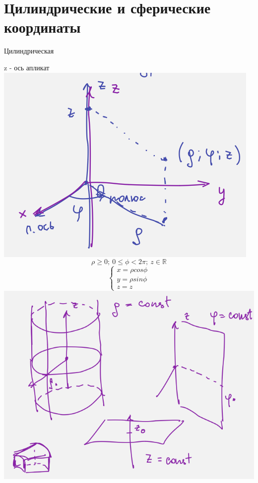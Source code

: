 \documentclass{article}
\begin{document}
\section{Цилиндрические и сферические координаты}
\begin{minipage}{.5\textwidth}
Цилиндрическая

z - ось апликат\\
\includegraphics[width=.6\textwidth]{chill}\\
\begin{equation*}
    \rho \geq 0;\ 0\leq\phi<2\pi;\ z\in \mathbb{R}
\end{equation*}
\begin{equation*}
    \begin{cases}
        x= \rho cos\phi\\
        y = \rho sin\phi\\
        z=z
    \end{cases}
\end{equation*}
\includegraphics[width=.6\textwidth]{CHILLCONST.png}\\
\end{minipage}
\hfill
\end{document}
